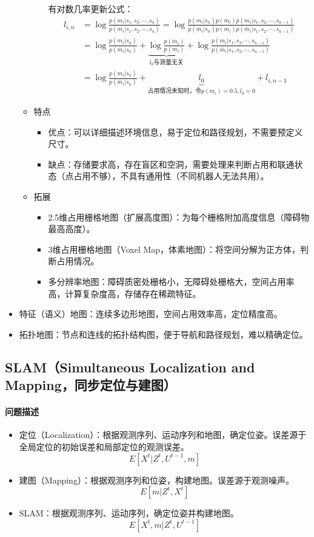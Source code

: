 \documentclass[
12pt, %
a4paper, 
oneside, %
headinclude,footinclude, %
]{scrartcl}
\begin{document}
\begin{itemize}
\begin{itemize}
\begin{itemize}
有对数几率更新公式：
\begin{align*}
l_{i, n} &= \log\frac{p(m_i|s_1, s_2, \cdots, s_n)}{p(\bar{m}_i|s_1, s_2, \cdots, s_n)} = \log\frac{p(m_i|s_n)p(\bar{m}_i)p(m_i|s_1, s_2, \cdots, s_{n - 1})}{p(\bar{m}_i|s_n)p(m_i)p(\bar{m}_i|s_1, s_2, \cdots, s_{n - 1})} \\
&= \log\frac{p(m_i|s_n)}{p(\bar{m}_i|s_n)} + \underbrace{\log\frac{p(\bar{m}_i)}{p(m_i)}}_{l_0\text{与测量无关}} + \log\frac{p(m_i|s_1, s_2, \cdots, s_{n - 1})}{p(\bar{m}_i|s_1, s_2, \cdots, s_{n - 1})} \\
&= \log\frac{p(m_i|s_n)}{p(\bar{m}_i|s_n)} + \underbrace{l_0}_{\text{占用情况未知时，令}p(m_i) = 0.5, l_0 = 0} + l_{i, n - 1}
\end{align*}
\end{itemize}
\item 特点
\begin{itemize}
\item 优点：可以详细描述环境信息，易于定位和路径规划，不需要预定义尺寸。
\item 缺点：存储要求高，存在盲区和空洞，需要处理来判断占用和联通状态（点占用不够），不具有通用性（不同机器人无法共用）。
\end{itemize}
\item 拓展
\begin{itemize}
\item 2.5维占用栅格地图（扩展高度图）：为每个栅格附加高度信息（障碍物最高高度）。
\item 3维占用栅格地图（Voxel Map，体素地图）：将空间分解为正方体，判断占用情况。
\item 多分辨率地图：障碍质密处栅格小，无障碍处栅格大，空间占用率高，计算复杂度高，存储存在稀疏特征。
\end{itemize}
\end{itemize}
\item 特征（语义）地图：连续多边形地图，空间占用效率高，定位精度高。
\item 拓扑地图：节点和连线的拓扑结构图，便于导航和路径规划，难以精确定位。
\end{itemize}
\subsection[SLAM]{SLAM（Simultaneous Localization and Mapping，同步定位与建图）}
\paragraph{问题描述}
\begin{itemize}
\item 定位（Localization）：根据观测序列、运动序列和地图，确定位姿。误差源于全局定位的初始误差和局部定位的观测误差。
$$ E[X^t|Z^t, U^{t - 1}, m] $$
\item 建图（Mapping）：根据观测序列和位姿，构建地图。误差源于观测噪声。
$$ E[m|Z^t, X^t] $$
\item SLAM：根据观测序列、运动序列，确定位姿并构建地图。
$$ E[X^t, m|Z^t, U^{t - 1}] $$
\end{itemize}
\end{document}
